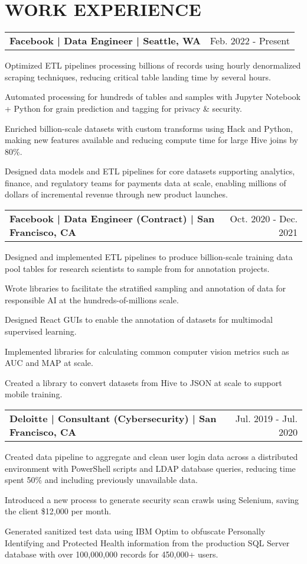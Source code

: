 \documentclass{article}
\makeatletter
\newcommand{\beginResumeList}{\begin{itemize}\setlength\itemsep{0em}\begin{minipage}{0.9\textwidth}}
\newcommand{\resumeListEnd}{\end{minipage}\end{itemize}}
\newcommand{\normalItem}[1]{\normalsize\item{#1}}
\newcommand{\experience}[2]{
  \begin{tabular*}{\textwidth}[t]{l@{\extracolsep{\fill}}r}
    \normalsize\textbf{#1} & \normalsize #2 \\
  \end{tabular*}
}
\makeatother
\begin{document}
  \section{WORK EXPERIENCE}
  \experience
    {Facebook | Data Engineer | Seattle, WA}
    {Feb. 2022 - Present}
    \beginResumeList
      \normalItem{Optimized ETL pipelines processing billions of records using hourly denormalized scraping techniques, reducing critical table landing time by several hours.}
      \normalItem{Automated processing for hundreds of tables and samples with Jupyter Notebook + Python for grain prediction and tagging for privacy \& security.}
      \normalItem{Enriched billion-scale datasets with custom transforms using Hack and Python, making new features available and reducing compute time for large Hive joins by 80\%.}
      \normalItem{Designed data models and ETL pipelines for core datasets supporting analytics, finance, and regulatory teams for payments data at scale, enabling millions of dollars of incremental revenue through new product launches.}
    \resumeListEnd

  \experience
    {Facebook | Data Engineer (Contract) | San Francisco, CA}
    {Oct. 2020 - Dec. 2021}
    \beginResumeList
      \normalItem{Designed and implemented ETL pipelines to produce billion-scale training data pool tables for research scientists to sample from for annotation projects.}
      \normalItem{Wrote libraries to facilitate the stratified sampling and annotation of data for responsible AI at the hundreds-of-millions scale.}
      \normalItem{Designed React GUIs to enable the annotation of datasets for multimodal supervised learning.}
      \normalItem{Implemented libraries for calculating common computer vision metrics such as AUC and MAP at scale.}
      \normalItem{Created a library to convert datasets from Hive to JSON at scale to support mobile training.}
    \resumeListEnd

  \experience
    {Deloitte | Consultant (Cybersecurity) | San Francisco, CA}
    {Jul. 2019 - Jul. 2020}
    \beginResumeList
      \normalItem{Created data pipeline to aggregate and clean user login data across a distributed environment with PowerShell scripts and LDAP database queries, reducing time spent 50\% and including previously unavailable data.}
      \normalItem{Introduced a new process to generate security scan crawls using Selenium, saving the client \$12,000 per month.}
      \normalItem{Generated sanitized test data using IBM Optim to obfuscate Personally Identifying and Protected Health information from the production SQL Server database with over 100,000,000 records for 450,000+ users.}
    \resumeListEnd
\end{document}
